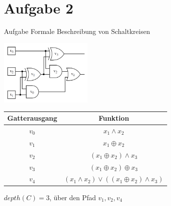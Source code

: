 
\section{Aufgabe 2}

\setcounter{exercise}{1}

\begin{frame}[allowframebreaks]{Aufgabe \thesection}{Formale Beschreibung von Schaltkreisen}
  \begin{solution}
    \centering
      \includegraphics[width=130pt]{figures/Schaltkreis.png}
  \end{solution}
  \begin{solution}
    \centering
      \begin{tabular}{c|c}
        Gatterausgang&Funktion\\ \hline
         $v_0$&$x_1\wedge x_2$\\
         $v_1$&$x_1\oplus x_2$\\
         $v_2$&$(x_1\oplus x_2)\wedge x_3$\\
         \hline
         $v_3$&$(x_1\oplus x_2)\oplus x_3$\\
         $v_4$&$(x_1\wedge x_2)\vee((x_1\oplus x_2)\wedge x_3)$\\
    \end{tabular}
  \end{solution}
  \begin{solution}
      $depth(C)=3$, über den Pfad $v_1,v_2,v_4$
  \end{solution}
\end{frame}
